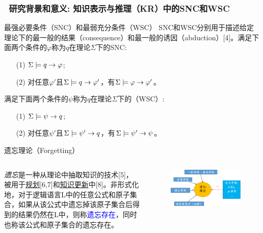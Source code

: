 \documentclass[9pt, CJK]{beamer}
\begin{document}
	\begin{frame}
		\frametitle{~研究背景和意义: {\small 知识表示与推理（KR）中的SNC和WSC}}
		{\small\begin{block}{最强必要条件（SNC）和最弱充分条件（WSC）}
			SNC和WSC分别用于描述给定理论下的最一般的结果（consequence）和最一般的诱因（abduction）[4]。满足下面两个条件的$\varphi$称为$q$在理论$\Sigma$下的SNC:
			\begin{itemize}
				\item[(1)] $\Sigma \models q \rightarrow \varphi$;
				\item[(2)] 对任意$\varphi'$且$\Sigma \models q \rightarrow \varphi'$，有$\Sigma \models \varphi \rightarrow \varphi'$。
			\end{itemize}
		满足下面两个条件的$\psi$称为$q$在理论$\Sigma$下的（WSC）:
		\begin{itemize}
			\item[(1)] $\Sigma \models \psi \rightarrow q$; 
			\item[(2)] 对任意$\psi'$且$\Sigma \models \psi' \rightarrow q$，有$\Sigma \models \psi' \rightarrow \psi$。
		\end{itemize}
		\end{block}}
		\vskip 0.5pt
		{\small\begin{block}{遗忘理论（Forgetting）}
			\begin{columns}
				 {\em 遗忘}是一种从理论中抽取知识的技术[5]，被用于\underline{规划}[6,7]和\underline{知识更新}中[8]。非形式化地，对于逻辑语言L中的任意公式和原子集合，如果从该公式中遗忘掉该原子集合后得到的结果仍然在L中，则称\textcolor{blue}{遗忘存在}，同时也称该公式和原子集合的遗忘存在。
				\begin{figure}
					\includegraphics[scale=0.35]{figures/forgetting}
				\end{figure}
			\end{columns}
		\end{block}}
	\end{frame}
	
\end{document}
